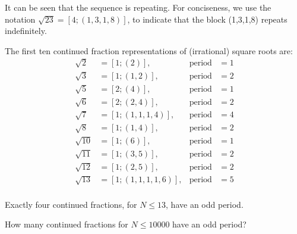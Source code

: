 It can be seen that the sequence is repeating. For conciseness, we use the notation \( \sqrt{23} = [4;(1,3,1,8)] \), to
indicate that the block (1,3,1,8) repeats indefinitely.

The first ten continued fraction representations of (irrational) square roots are:
\begin{align*}
	\sqrt{2}  & = [1;(2)],         & \text{period} & =1 \\
	\sqrt{3}  & = [1;(1,2)],       & \text{period} & =2 \\
	\sqrt{5}  & = [2;(4)],         & \text{period} & =1 \\
	\sqrt{6}  & = [2;(2,4)],       & \text{period} & =2 \\
	\sqrt{7}  & = [1;(1,1,1,4)],   & \text{period} & =4 \\
	\sqrt{8}  & = [1;(1,4)],       & \text{period} & =2 \\
	\sqrt{10} & = [1;(6)],         & \text{period} & =1 \\
	\sqrt{11} & = [1;(3,5)],       & \text{period} & =2 \\
	\sqrt{12} & = [1;(2,5)],       & \text{period} & =2 \\
	\sqrt{13} & = [1;(1,1,1,1,6)], & \text{period} & =5 \\
\end{align*}

Exactly four continued fractions, for \( N \le 13 \), have an odd period.

How many continued fractions for \( N \le 10 000 \) have an odd period?
